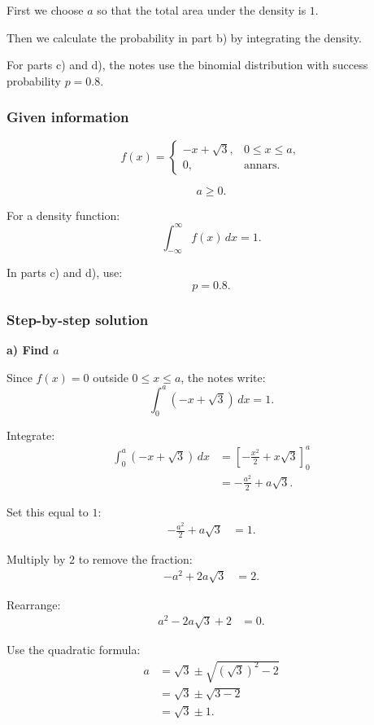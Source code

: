 \documentclass[10pt]{article}
\begin{document}
First we choose \(a\) so that the total area under
the density is \(1\).

Then we calculate the probability in part b) by
integrating the density.

For parts c) and d), the notes use the binomial
distribution with success probability \(p=0.8\).

\subsubsection*{Given information}

\[
f(x)=
\begin{cases}
-x+\sqrt{3},
& 0\le x\le a,\\
0,
& \text{annars}.
\end{cases}
\]

\[
a\ge 0.
\]

For a density function:
\[
\int_{-\infty}^{\infty} f(x)\,dx=1.
\]

In parts c) and d), use:
\[
p=0.8.
\]

\subsubsection*{Step-by-step solution}

\textbf{a) Find \(a\)}

Since \(f(x)=0\) outside \(0\le x\le a\), the notes
write:
\[
\int_0^a
(-x+\sqrt{3})\,dx
=1.
\]

Integrate:
\begin{align*}
\int_0^a
(-x+\sqrt{3})\,dx
&=
\left[
-\frac{x^2}{2}
+x\sqrt{3}
\right]_0^a
\\[2mm]
&=
-\frac{a^2}{2}
+a\sqrt{3}.
\end{align*}

Set this equal to \(1\):
\begin{align*}
-\frac{a^2}{2}
+a\sqrt{3}
&=1.
\end{align*}

Multiply by \(2\) to remove the fraction:
\begin{align*}
-a^2+2a\sqrt{3}
&=2.
\end{align*}

Rearrange:
\begin{align*}
a^2-2a\sqrt{3}+2
&=0.
\end{align*}

Use the quadratic formula:
\begin{align*}
a
&=
\sqrt{3}
\pm
\sqrt{(\sqrt{3})^2-2}
\\[2mm]
&=
\sqrt{3}
\pm
\sqrt{3-2}
\\[2mm]
&=
\sqrt{3}\pm 1.
\end{align*}
\end{document}
